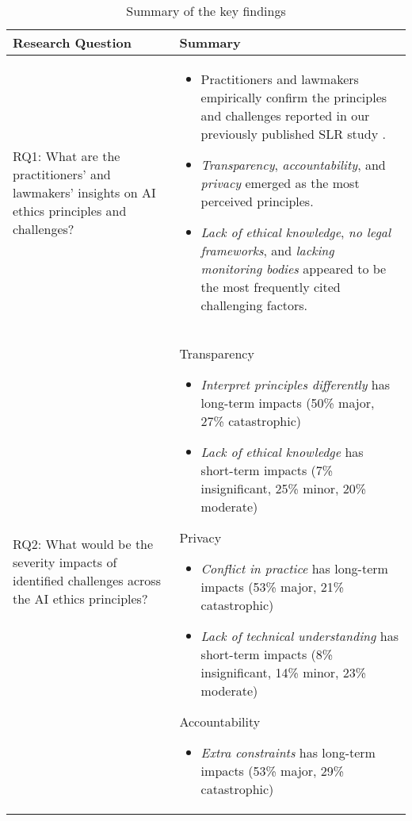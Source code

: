 \begin{table*}
\centering
\caption{Summary of the key findings}
\label{tab:Summary of key findings}
\begin{tabular}{|m{3cm}|m{10cm}|}
\hline
\textbf{Research Question} & \textbf{Summary} \\ \hline
RQ1: What are the practitioners' and lawmakers' insights on AI ethics principles and challenges? & 
\begin{itemize}%
    \item Practitioners and lawmakers empirically confirm the principles and challenges reported in our previously published SLR study \cite{AR13}.
    \item \textit{Transparency}, \textit{accountability}, and \textit{privacy} emerged as the most perceived principles.
    \item \textit{Lack of ethical knowledge}, \textit{no legal frameworks}, and \textit{lacking monitoring bodies} appeared to be the most frequently cited challenging factors.
\end{itemize} \\
\hline
RQ2: What would be the severity impacts of identified challenges across the AI ethics principles? & 
Transparency \vspace{0mm}
\begin{itemize}%
    \item \textit{Interpret principles differently} has long-term impacts (50\% major, 27\% catastrophic)
    \item \textit{Lack of ethical knowledge} has short-term impacts (7\% insignificant, 25\% minor, 20\% moderate)
\end{itemize} 
Privacy \vspace{0mm}
\begin{itemize}%
    \item \textit{Conflict in practice} has long-term impacts (53\% major, 21\% catastrophic)
    \item \textit{Lack of technical understanding} has short-term impacts (8\% insignificant, 14\% minor, 23\% moderate)
\end{itemize} 
Accountability \vspace{0mm}
\begin{itemize}%
    \item \textit{Extra constraints} has long-term impacts (53\% major, 29\% catastrophic)

\end{itemize}
\end{tabular}
\end{table*}
